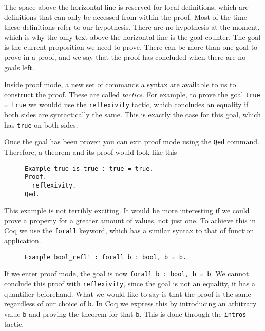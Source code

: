 The space above the horizontal line is reserved for local definitions, which are definitions that can
only be accessed from within the proof. Most of the time these definitions refer to our hypothesis. There
are no hypothesis at the moment, which is why the only text above the horizontal line is the goal counter.
The goal is the current proposition we need to prove. There can be more than one goal to prove in a proof,
and we say that the proof has concluded when there are no goals left.

Inside proof mode, a new set of commands a syntax are available to us to construct the proof. These are
called \emph{tactics}. For example, to prove the goal \texttt{true = true} we wouldd use the 
\texttt{reflexivity} tactic, which concludes an equality if both sides are syntactically the same. This is
exactly the case for this goal, which has \texttt{true} on both sides.

Once the goal has been proven you can exit proof mode using the \texttt{Qed} command. Therefore,
a theorem and its proof would look like this

\begin{figure}[!ht]
\begin{verbatim}
Example true_is_true : true = true.
Proof.
  reflexivity.
Qed.
\end{verbatim}
\label{lst:true-is-true}
\end{figure}

This example is not terribly exciting. It would be more interesting if we could prove a property 
for a greater amount of values, not just one. To achieve this in Coq we use the
\texttt{forall} keyword, which has a similar syntax to that of function application.

\begin{figure}[!ht]
\begin{verbatim}
Example bool_refl' : forall b : bool, b = b.
\end{verbatim}
\label{lst:bool-eq-refl}
\end{figure}

If we enter proof mode, the goal is now \texttt{forall b : bool, b = b}. We cannot conclude this
proof with \texttt{reflexivity}, since the goal is not an equality, it has a quantifier 
beforehand. What we would like to say is that the proof is the same regardless of our choice of 
\texttt{b}. In Coq we express this by introducing an arbitrary value \texttt{b} and
proving the theorem for that \texttt{b}. This is done through the \texttt{intros} 
tactic.

